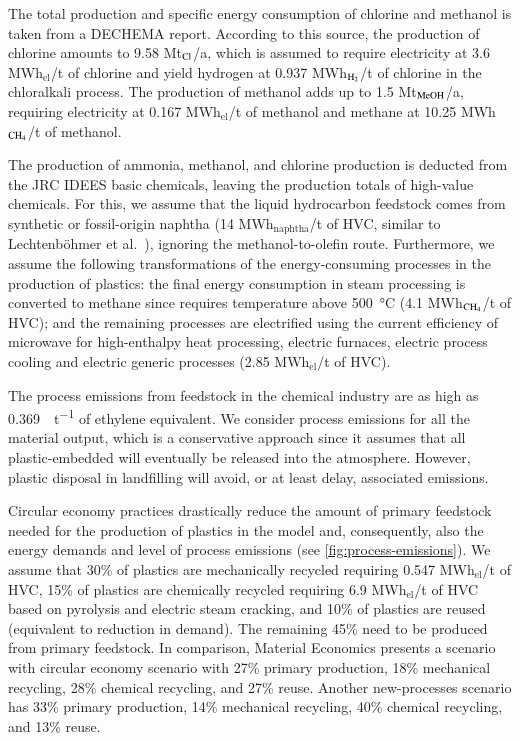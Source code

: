 The total production and specific energy consumption of chlorine and methanol is
taken from a DECHEMA report. According to this
source, the production of chlorine amounts to 9.58 Mt$_{\ce{Cl}}$/a, which is assumed
to require electricity at 3.6 MWh$_{\text{el}}$/t of chlorine and yield hydrogen at
0.937 MWh$_{\ce{H2}}$/t of chlorine in the chloralkali process. The production of
methanol adds up to 1.5 Mt$_{\ce{MeOH}}$/a, requiring electricity at 0.167 MWh$_{\text{el}}$/t
of methanol and methane at 10.25 MWh$_{\ce{CH4}}$/t of methanol.

The production of ammonia, methanol, and chlorine production is deducted from
the JRC IDEES basic chemicals, leaving the production totals of high-value
chemicals. For this, we assume that the liquid hydrocarbon feedstock comes from
synthetic or fossil-origin naphtha (14 MWh$_{\text{naphtha}}$/t of HVC, similar
to Lechtenböhmer et al.~), ignoring
the methanol-to-olefin route. Furthermore, we assume the following
transformations of the energy-consuming processes in the production of plastics:
the final energy consumption in steam processing is converted to methane since
requires temperature above \SI{500}{\celsius} (4.1 MWh$_{\ce{CH4}}$/t of
HVC); and the remaining processes are
electrified using the current efficiency of microwave for high-enthalpy heat
processing, electric furnaces, electric process cooling and electric generic
processes (2.85 MWh$_{\text{el}}$/t of HVC).

The process emissions from feedstock in the chemical industry are as high as
\SI{0.369}{\tco\per\tonne} of ethylene equivalent. We consider process emissions
for all the material output, which is a conservative approach since it assumes
that all plastic-embedded \co will eventually be released into the atmosphere.
However, plastic disposal in landfilling will avoid, or at least delay,
associated \co emissions.

Circular economy practices drastically reduce the amount of primary feedstock
needed for the production of plastics in the model
 and, consequently, also the energy demands
and level of process emissions (see
\cref{fig:process-emissions}). We assume that 30\% of plastics are mechanically
recycled requiring 0.547 MWh$_{\text{el}}$/t of HVC,
 15\% of plastics are chemically recycled
requiring 6.9 MWh$_{\text{el}}$/t of HVC based on pyrolysis and electric steam
cracking, and 10\% of
plastics are reused (equivalent to reduction in demand). The remaining 45\% need
to be produced from primary feedstock. In comparison, Material Economics
 presents a scenario with circular economy scenario with
27\% primary production, 18\% mechanical recycling, 28\% chemical recycling, and
27\% reuse. Another new-processes scenario has 33\% primary production, 14\%
mechanical recycling, 40\% chemical recycling, and 13\% reuse.

